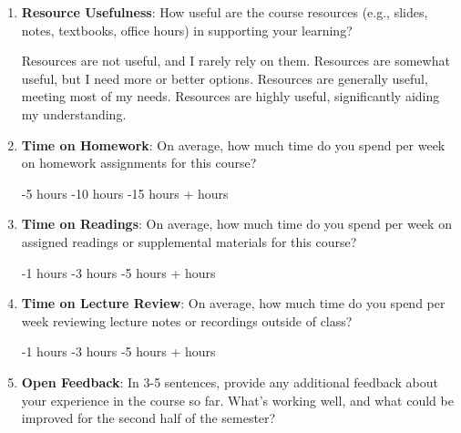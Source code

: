 \documentclass[12pt,letterpaper, onecolumn]{exam}
\begin{document}
\begin{questions}
\begin{enumerate}[label=(\alph*)]
    \item \textbf{Resource Usefulness}: How useful are the course resources (e.g., slides, notes, textbooks, office hours) in supporting your learning?
    \begin{choices}
        \choice Resources are not useful, and I rarely rely on them.
        \choice Resources are somewhat useful, but I need more or better options.
        \choice Resources are generally useful, meeting most of my needs.
        \choice Resources are highly useful, significantly aiding my understanding.
    \end{choices}

    \item \textbf{Time on Homework}: On average, how much time do you spend per week on homework assignments for this course?
    \begin{choices}
        -5 hours
        -10 hours
        -15 hours
        + hours
    \end{choices}

    \item \textbf{Time on Readings}: On average, how much time do you spend per week on assigned readings or supplemental materials for this course?
    \begin{choices}
        -1 hours
        -3 hours
        -5 hours
        + hours
    \end{choices}

    \item \textbf{Time on Lecture Review}: On average, how much time do you spend per week reviewing lecture notes or recordings outside of class?
    \begin{choices}
        -1 hours
        -3 hours
        -5 hours
        + hours
    \end{choices}

    \item \textbf{Open Feedback}: In 3-5 sentences, provide any additional feedback about your experience in the course so far. What’s working well, and what could be improved for the second half of the semester?
\end{enumerate}
\begin{solution}
    \begin{parts}
        \part 
        \part 

\end{parts}
\end{solution}
\end{questions}
\end{document}
